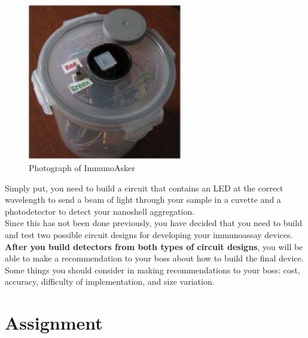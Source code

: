 \documentclass{article}
\begin{document}
\begin{figure}[h]
    \includegraphics[width=0.6\textwidth]{fig_2.jpg}
    \centering
\caption{Photograph of ImmunoAsker}
\label{fig_2}
\end{figure}

Simply put, you need to build a circuit that contains an LED at the correct wavelength to send a beam of light through your sample in a cuvette and a photodetector to detect your nanoshell aggregation.\\

Since this has not been done previously, you have decided that you need to build and test two possible circuit designs for developing your immunoassay devices. \textbf{After you build detectors from both types of circuit designs}, you will be able to make a recommendation to your boss about how to build the final device.\\

Some things you should consider in making recommendations to your boss: cost, accuracy, difficulty of implementation, and size variation.\\

\section*{Assignment}
\end{document}
